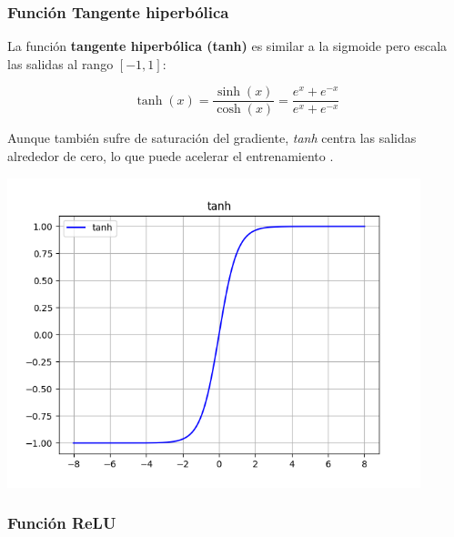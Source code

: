 \subsubsection*{Función Tangente hiperbólica}
 

\begin{minipage}{0.6\textwidth}
    La función \textbf{tangente hiperbólica (tanh)} es similar a la sigmoide pero escala las salidas al rango \([-1, 1]\):

\begin{equation}
    \tanh(x) = \frac{\sinh(x)}{\cosh(x)} = \frac{e^x + e^{-x}}{e^x + e^{-x}}
\end{equation}

Aunque también sufre de saturación del gradiente, \textit{tanh} centra las salidas alrededor de cero, lo que puede acelerar el entrenamiento \citep{pajares2021aprendizaje}. 
\end{minipage}
\begin{minipage}{0.05\textwidth}
\textbf{ }
\end{minipage}
\begin{minipage}{0.35\textwidth}
    \includegraphics[width=0.9\textwidth]{img/tanh.png}
    \label{img: tanh}
\end{minipage}



\subsubsection*{Función ReLU}

